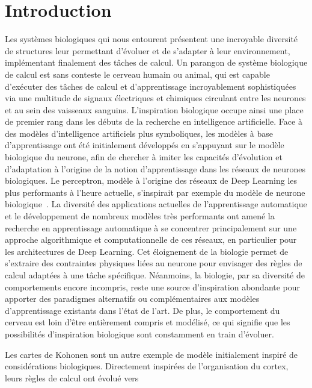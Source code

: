 \chapter*{Introduction}

Les systèmes biologiques qui nous entourent présentent une incroyable diversité de structures leur permettant d'évoluer et de s'adapter à leur environnement, implémentant finalement des tâches de calcul.
Un parangon de système biologique de calcul est sans conteste le cerveau humain ou animal, qui est capable d'exécuter des tâches de calcul et d'apprentissage incroyablement sophistiquées via une multitude de signaux électriques et chimiques circulant entre les neurones et au sein des vaisseaux sanguins.
L'inspiration biologique occupe ainsi une place de premier rang dans les débuts de la recherche en intelligence artificielle. Face à des modèles d'intelligence artificiels plus symboliques, les modèles à base d'apprentissage ont été initialement développés en s'appuyant sur le modèle biologique du neurone, afin de chercher à imiter les capacités d'évolution et d'adaptation à l'origine de la notion d'apprentissage dans les réseaux de neurones biologiques. Le perceptron, modèle à l'origine des réseaux de Deep Learning les plus performants à l'heure actuelle, s'inspirait par exemple du modèle de neurone biologique~\cite{McCulloch1990ALC}.
La diversité des applications actuelles de l'apprentissage automatique et le développement de nombreux modèles très performants ont amené la recherche en apprentissage automatique à se concentrer principalement sur une approche algorithmique et computationnelle de ces réseaux, en particulier pour les architectures de Deep Learning. 
Cet éloignement de la biologie permet de s'extraire des contraintes physiques liées au neurone pour envisager des règles de calcul adaptées à une tâche spécifique.
Néanmoins, la biologie, par sa diversité de comportements encore incompris, reste une source d'inspiration abondante pour apporter des paradigmes alternatifs ou complémentaires aux modèles d'apprentissage existants dans l'état de l'art. De plus, le comportement du cerveau est loin d'être entièrement compris et modélisé, ce qui signifie que les possibilités d'inspiration biologique sont constamment en train d'évoluer.

Les cartes de Kohonen \parencite{Kohonen1982} sont un autre exemple de modèle initialement inspiré de considérations biologiques. Directement inspirées de l'organisation du cortex, leurs règles de calcul ont évolué vers 

